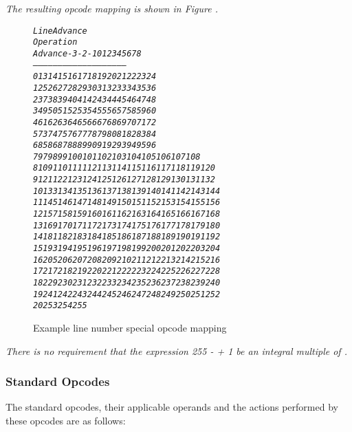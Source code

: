 \textit{The resulting opcode mapping is shown in
Figure .}

\begin{figure}[ht]
\begin{alltt}\textit{
                        Line Advance
   Operation  
     Advance    -3  -2  -1   0   1   2   3   4   5   6   7   8
   ---------   -----------------------------------------------
           0    13  14  15  16  17  18  19  20  21  22  23  24
           1    25  26  27  28  29  30  31  32  33  34  35  36
           2    37  38  39  40  41  42  43  44  45  46  47  48
           3    49  50  51  52  53  54  55  56  57  58  59  60
           4    61  62  63  64  65  66  67  68  69  70  71  72
           5    73  74  75  76  77  78  79  80  81  82  83  84
           6    85  86  87  88  89  90  91  92  93  94  95  96
           7    97  98  99 100 101 102 103 104 105 106 107 108
           8   109 110 111 112 113 114 115 116 117 118 119 120
           9   121 122 123 124 125 126 127 128 129 130 131 132
          10   133 134 135 136 137 138 139 140 141 142 143 144
          11   145 146 147 148 149 150 151 152 153 154 155 156
          12   157 158 159 160 161 162 163 164 165 166 167 168
          13   169 170 171 172 173 174 175 176 177 178 179 180
          14   181 182 183 184 185 186 187 188 189 190 191 192
          15   193 194 195 196 197 198 199 200 201 202 203 204
          16   205 206 207 208 209 210 211 212 213 214 215 216
          17   217 218 219 220 221 222 223 224 225 226 227 228 
          18   229 230 231 232 233 234 235 236 237 238 239 240 
          19   241 242 243 244 245 246 247 248 249 250 251 252
          20   253 254 255
}\end{alltt}
\caption{Example line number special opcode mapping}
\label{fig:examplelinenumberspecialopcodemapping}
\end{figure}

\textit{There is no requirement that the expression 
255 -  + 1 be an integral multiple of
. }

\subsubsection{Standard Opcodes}
\label{chap:standardopcodes}


The standard opcodes, their applicable operands and the
actions performed by these opcodes are as follows:

